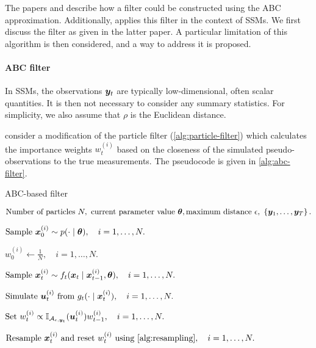 The papers \cite{tina-toni} and \cite{jasra-filtering} describe how a filter could be constructed using the ABC approximation. Additionally, \cite{jasra-time-series} applies this filter in the context of SSMs. We first discuss the filter as given in the latter paper. A particular limitation of this algorithm is then considered, and a way to address it is proposed.

\paragraph{ABC filter}
In SSMs, the observations $\bm{y}_t$ are typically low-dimensional, often scalar quantities. It is then not necessary to consider any summary statistics. For simplicity, we also assume that $\rho$ is the Euclidean distance.

\cite{jasra-filtering} consider a modification of the particle filter (\autoref{alg:particle-filter}) which calculates the importance weights $w_t^{(i)}$ based on the closeness of the simulated pseudo-observations to the true measurements. The pseudocode is given in \autoref{alg:abc-filter}.

\begin{algorithm}[ht]
    \caption{ABC-based filter}
    \label{alg:abc-filter}
    \begin{algorithmic}[1]
        \Input $\text{Number of particles } N,\ \text{current parameter value } \btheta, \text{maximum distance } \epsilon,\ \left\{\by_1, \ldots, \by_T\right\}.$
        
        \State $\text{Sample } \bm{x}_0^{(i)} \sim p(\cdot \mid \bm{\theta}), \quad i = 1, \ldots, N.$ 
        
        \State $w_0^{(i)} \gets \frac{1}{N}, \quad i = 1, \ldots, N.$ 
        
        \State $\text{Sample } \bm{x}_t^{(i)} \sim f_t(\bm{x}_t \mid \bm{x}_{t-1}^{(i)}, \bm{\theta}), \quad i = 1, \ldots, N.$ 
        
        \State $\text{Simulate } \bm{u}_t^{(i)} \text{ from } g_t(\cdot \mid \bm{x}_t^{(i)}), \quad i = 1, \ldots, N.$ 
        
        \State $\text{Set } w_t^{(i)} \propto \mathbb{I}_{\mathcal{A}_{\epsilon, \bm{y}_t}}(\bm{u}_t^{(i)}) w_{t-1}^{(i)}, \quad i = 1, \ldots, N.$
        
        \State $\text{Resample } \bx_t^{(i)} \text{ and reset } w_t^{(i)} \text{ using \autoref{alg:resampling}}, \quad i = 1, \ldots, N.$
        \EndFor
    \end{algorithmic}
\end{algorithm}

